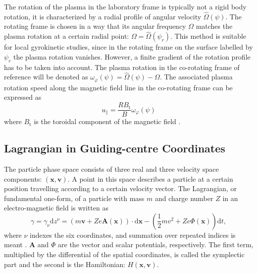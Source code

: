 \documentclass[a4paper,10pt]{article}
\newcommand{\st}[1]{\mathrm{#1}} %
\renewcommand{\vec}[1]{\mathbf{#1}}
\begin{document}
The rotation of the plasma in the laboratory frame is typically not a rigid body rotation, it is characterized by a radial profile of angular velocity $\hat{\Omega}(\psi)$. The rotating frame is chosen in a way that its angular frequency $\Omega$ matches the plasma rotation at a certain radial point: $\Omega = \hat{\Omega}(\psi_r)$. This method is suitable for local gyrokinetic studies, since in the rotating frame on the surface labelled by $\psi_r$ the plasma rotation vanishes. However, a finite gradient of the rotation profile has to be taken into account. The plasma rotation in the co-rotating frame of reference will be denoted as $\omega_{\varphi}(\psi) = \hat{\Omega}(\psi) - \Omega$. The associated plasma rotation speed along the magnetic field line in the co-rotating frame can be expressed as
\begin{equation}
 u_{\parallel} = \frac{R B_{\st{t}}}{B} \omega_{\varphi}(\psi)
 \label{eq:parallel_rot_speed}
\end{equation}
where $B_{\st{t}}$ is the toroidal component of the magnetic field \cite{peeters_rotation}. 

\subsection{Lagrangian in Guiding-centre Coordinates} \label{sec:guiding}
The particle phase space consists of three real and three velocity space components: $(\mathbf{x},\mathbf{v})$. A point in this space describes a particle at a certain position travelling according to a certain velocity vector. The Lagrangian, or fundamental one-form, of a particle with mass $m$ and charge number $Z$ in an electro-magnetic field is written as
\begin{equation}
	\gamma = \gamma_{\nu} \mathrm{d} z^{\nu} = \left( m \mathbf{v} + Z e \mathbf{A}(\mathbf{x}) \right) \cdot \mathrm{d} \mathbf{x} - \left( \frac{1}{2} m v^2 + Z e \Phi(\mathbf{x}) \right) \mathrm{d}t,
\end{equation}
where $\nu$ indexes the six coordinates, and summation over repeated indices is meant \cite{scott_gotit}. $\vec{A}$ and $\Phi$ are the  vector and scalar potentials, respectively. The first term, multiplied by the differential of the spatial coordinates, is called the symplectic part and the second is the Hamiltonian: $H(\mathbf{x},\mathbf{v})$. 
 
\end{document}
